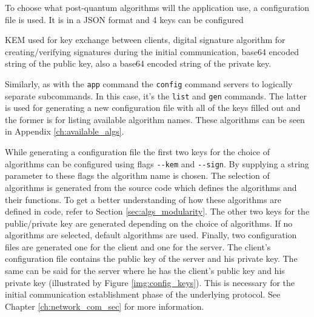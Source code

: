 To choose what post-quantum algorithms will the application use, a configuration file is used. It is in a JSON format and 4 keys can be configured
\begin{itemize}
  KEM used for key exchange between clients,
  digital signature algorithm for creating/verifying signatures during the initial communication,
  base64 encoded string of the public key,
  also a base64 encoded string of the private key.
\end{itemize}
Similarly, as with the \texttt{app} command the \texttt{config} command servers to logically separate subcommands. In this case, it's the \texttt{list} and \texttt{gen} commands. The latter is used for generating a new configuration file with all of the keys filled out and the former is for listing available algorithm names. These algorithms can be seen in Appendix \ref{ch:available_algs}.

While generating a configuration file the first two keys for the choice of algorithms can be configured using flags \texttt{-\--kem} and \texttt{-\--sign}. By supplying a string parameter to these flags the algorithm name is chosen. The selection of algorithms is generated from the source code which defines the algorithms and their functions. To get a better understanding of how these algorithms are defined in code, refer to Section \ref{sec:algs_modularity}. The other two keys for the public/private key are generated depending on the choice of algorithms. If no algorithms are selected, default algorithms are used. Finally, two configuration files are generated one for the client and one for the server. The client's configuration file contains the public key of the server and his private key. The same can be said for the server where he has the client's public key and his private key (illustrated by Figure \ref{img:config_keys}). This is necessary for the initial communication establishment phase of the underlying protocol. See Chapter \ref{ch:network_com_sec} for more information.
